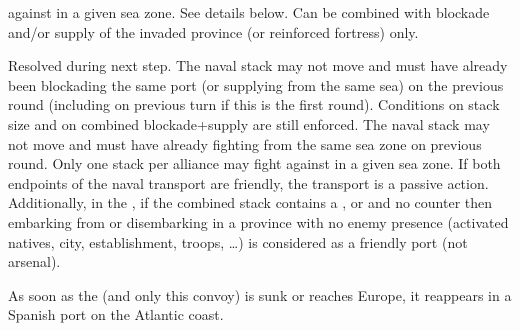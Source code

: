 against \corsaire in a given sea zone.
 See details below. Can be combined with blockade
and/or supply of the invaded province (or reinforced fortress) only.


\bparag[Exploration.] Resolved during next step.
 The naval stack may not move and
must have already been blockading the same port (or supplying from the same
sea) on the previous round (including on previous turn if this is the first
round). Conditions on stack size and on combined blockade+supply are still
enforced.
 The naval stack may not move and
must have already fighting \corsaire from the same sea zone on previous
round. Only one stack per alliance may fight against \corsaire in a given sea
zone.
 If both endpoints of the naval transport
are friendly, the transport is a passive action. Additionally, in the \ROTW,
if the combined stack contains a \LeaderE, \LeaderC or \LeaderGov and no \ARMY
counter then embarking from or disembarking in a province with no enemy
presence (activated natives, city, establishment, troops, \ldots) is
considered as a friendly port (not arsenal).

 \label{chMilitary:FlotaDeOroMovement} As soon as the
 (and only this convoy) is sunk or reaches Europe, it
reappears in a Spanish port on the Atlantic coast.

